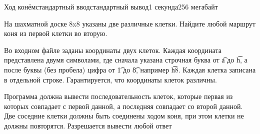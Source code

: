 \begin{problem}{Ход конём}{стандартный ввод}{стандартный вывод}{1 секунда}{256 мегабайт}

На шахматной доске 8x8 указаны две различные клетки. Найдите любой маршрут коня из первой клетки во вторую.

\InputFile
Во входном файле заданы координаты двух клеток. Каждая координата представлена двумя символами, где сначала указана строчная буква от \t{a} до \t{h}, а после буквы (без пробела) цифра от \t{1} до \t{8}, например \t{h8}. Каждая клетка записана в отдельной строке. Гарантируется, что координаты клеток различны.

\OutputFile
Программа должна вывести последовательность клеток, которые первая из которых совпадает с первой данной, а последняя совпадает со второй данной. Две соседние клетки должны быть соединены ходом коня, при этом клетки не должны повторятся. Разрешается вывести любой ответ

\Example

\begin{example}
%
\end{example}

\end{problem}


